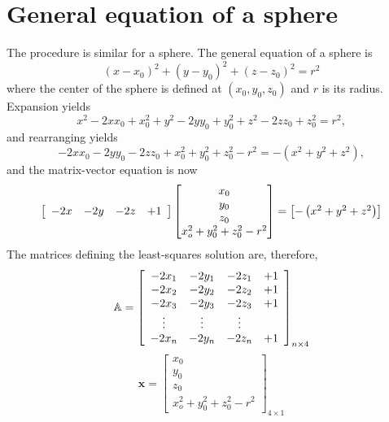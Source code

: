 \documentclass[11pt,letterpaper,onecolumn]{IEEEtran}
\begin{document}
\section{General equation of a sphere}
The procedure is similar for a sphere. The general equation of a sphere is
\begin{equation}
\left(x-x_0\right)^2 + \left(y-y_0\right)^2 + \left(z-z_0\right)^2= r^2
\end{equation}
where the center of the sphere is defined at $\left(x_0, y_0, z_0\right)$ and $r$ is its radius.
Expansion yields
\begin{equation}
x^2 -2x x_0 +x_0^2 + y^2 -2y y_0 +y_0^2 + z^2 -2z z_0 +z_0^2= r^2,
\end{equation}
and rearranging yields
\begin{equation}
-2x x_0 -2y y_0 -2z z_0  +x_0^2 +y_0^2 +z_0^2 -r^2 = -\left(x^2 + y^2 + z^2\right),
\end{equation}
and the matrix-vector equation is now
\begin{equation}
\begin{bmatrix}
\begin{array}{c c c c}
-2x &-2y & -2z &+1
\end{array}
\end{bmatrix}
\begin{bmatrix}
x_0 \\ y_0 \\ z_0 \\ x_o^2 + y_0^2 +z_0^2 -r^2
\end{bmatrix} = 
\begin{bmatrix}
-\left(x^2 + y^2 +z^2\right)
\end{bmatrix}
\end{equation}
The matrices defining the least-squares solution are, therefore, 
\begin{equation}
\mathbb{A} = 
\begin{bmatrix}
\begin{array}{c c c c}
-2x_1 &-2y_1 &-2z_1 &+1 \\
-2x_2 &-2y_2 &-2z_2 &+1 \\
-2x_3 &-2y_3 &-2z_3 &+1 \\
\vdots	& \vdots & \vdots \\
-2x_n &-2y_n &-2z_n &+1 \\
\end{array}
\end{bmatrix}_{ n \times 4}
\end{equation}
\begin{equation}
\mathbf{x} = 
\begin{bmatrix}
x_0 \\ y_0 \\ z_0 \\ x_o^2 + y_0^2 + z_0^2 -r^2
\end{bmatrix}_{ 4 \times 1}
\end{equation}
\end{document}
